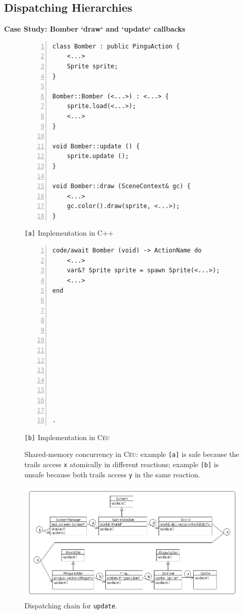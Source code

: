 \documentclass{vgtc}                          %
\newcommand{\CEU}{\textsc{C\'{e}u}\xspace}
\newcommand{\code}[1] {{\small{\texttt{#1}}}}
\newcommand{\ax}{\code{[a]}\xspace}
\newcommand{\bx}{\code{[b]}\xspace}
\begin{document}
\subsection{Dispatching Hierarchies}

\textbf{Case Study: Bomber `draw` and `update` callbacks}

\begin{figure}[t]
\begin{minipage}[t]{0.50\linewidth}
\begin{lstlisting}[numbers=left,xleftmargin=3em]
class Bomber : public PinguAction {
    <...>
    Sprite sprite;
}

Bomber::Bomber (<...>) : <...> {
    sprite.load(<...>);
    <...>
}

void Bomber::update () {
    sprite.update ();
}

void Bomber::draw (SceneContext& gc) {
    <...>
    gc.color().draw(sprite, <...>);
}
\end{lstlisting}
\centering\small{\ax Implementation in C++}
\end{minipage}
%
\begin{minipage}[t]{0.50\linewidth}
\begin{lstlisting}[numbers=left,xleftmargin=3em]
code/await Bomber (void) -> ActionName do
    <...>
    var&? Sprite sprite = spawn Sprite(<...>);
    <...>
end












.
\end{lstlisting}
\centering\small{\bx Implementation in \CEU}
\end{minipage}
\caption{ Shared-memory concurrency in \CEU:
example \ax is safe because the trails access \code{x} atomically in different 
reactions;
example \bx is unsafe because both trails access \code{y} in the same reaction.
\label{lst.shared}
}
\end{figure}

\begin{figure}[t]
\centering
\includegraphics[width=\columnwidth]{hierarchy}
\caption{Dispatching chain for \code{update}.
\label{fig.hier}
}
\end{figure}
\end{document}
